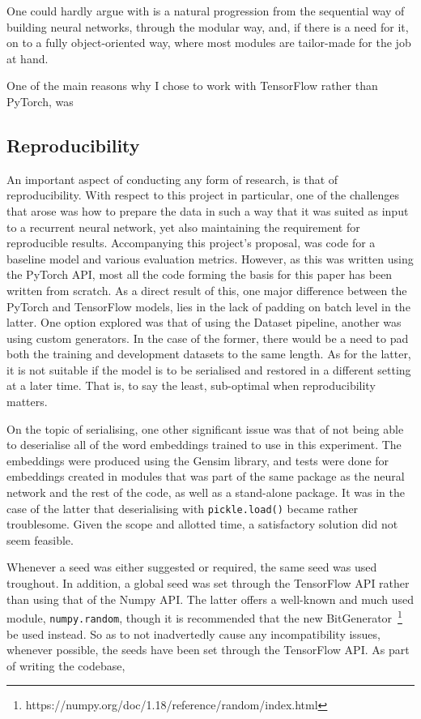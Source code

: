 \documentclass{acl2020}
\begin{document}
One could hardly argue with is a natural progression from the sequential way of building neural networks, through the modular way, and, if there is a need for it, on to a fully object-oriented way, where most modules are tailor-made for the job at hand.

One of the main reasons why I chose to work with TensorFlow rather than PyTorch, was


\subsection{Reproducibility}
\label{subsec:reproducability}

An important aspect of conducting any form of research, is that of reproducibility. With respect to this project in particular, one of the challenges that arose was how to prepare the data in such a way that it was suited as input to a recurrent neural network, yet also maintaining the requirement for reproducible results. Accompanying this project's proposal, was code for a baseline model and various evaluation metrics. However, as this was written using the PyTorch API, most all the code forming the basis for this paper has been written from scratch. As a direct result of this, one major difference between the PyTorch and TensorFlow models, lies in the lack of padding on batch level in the latter. One option explored was that of using the Dataset pipeline, another was using custom generators. In the case of the former, there would be a need to pad both the training and development datasets to the same length. As for the latter, it is not suitable if the model is to be serialised and restored in a different setting at a later time. That is, to say the least, sub-optimal when reproducibility matters.

On the topic of serialising, one other significant issue was that of not being able to deserialise all of the word embeddings trained to use in this experiment. The embeddings were produced using the Gensim library, and tests were done for embeddings created in modules that was part of the same package as the neural network and the rest of the code, as well as a stand-alone package. It was in the case of the latter that deserialising with {\small\verb|pickle.load()|} became rather troublesome. Given the scope and allotted time, a satisfactory solution did not seem feasible.

Whenever a seed was either suggested or required, the same seed was used troughout. In addition, a global seed was set through the TensorFlow API rather than using that of the Numpy API. The latter offers a well-known and much used module, {\small\verb|numpy.random|}, though it is recommended that the new BitGenerator~\footnote{https://numpy.org/doc/1.18/reference/random/index.html} be used instead. So as to not inadvertedly cause any incompatibility issues, whenever possible, the seeds have been set through the TensorFlow API. As part of writing the codebase,
\end{document}
